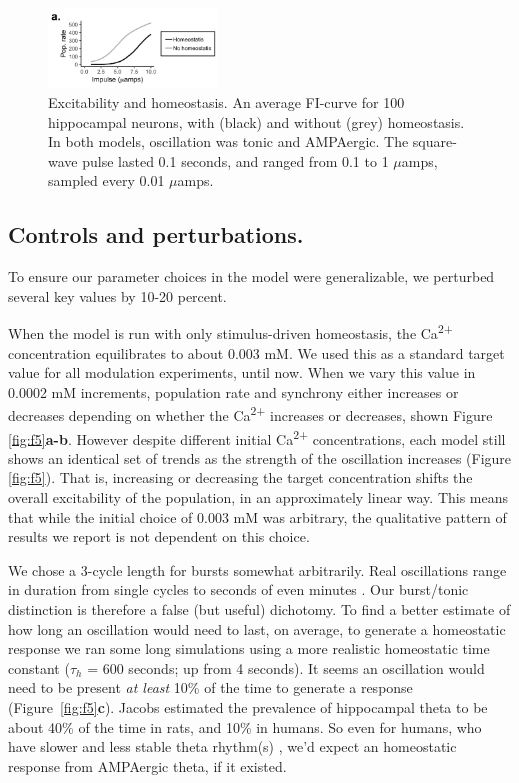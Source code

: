 \documentclass{article}
\begin{document}
\begin{figure}
\centering
\includegraphics[width=0.4\textwidth]{fig4.png}
\caption{\label{fig:f4}
Excitability and homeostasis. An average FI-curve for 100 hippocampal neurons, with (black) and without (grey) homeostasis. In both models, oscillation was tonic and AMPAergic. The square-wave pulse lasted 0.1 seconds, and ranged from 0.1 to 1 $\mu$amps, sampled every 0.01 $\mu$amps.
}
\end{figure}

\subsection*{Controls and perturbations.}
To ensure our parameter choices in the model were generalizable, we perturbed several key values by 10-20 percent.

When the model is run with only stimulus-driven homeostasis, the Ca\textsuperscript{2+} concentration equilibrates to about 0.003 mM. We used this as a standard target value for all modulation experiments, until now. When we vary this value in 0.0002 mM increments, population rate and synchrony either increases or decreases depending on whether the Ca\textsuperscript{2+} increases or decreases, shown Figure \ref{fig:f5}\textbf{a-b}. However despite different initial Ca\textsuperscript{2+} concentrations, each model still shows an identical set of trends as the strength of the oscillation increases (Figure \ref{fig:f5}). That is, increasing or decreasing the target concentration shifts the overall excitability of the population, in an approximately linear way. This means that while the initial choice of 0.003 mM was arbitrary, the qualitative pattern of results we report is not dependent on this choice.

We chose a 3-cycle length for bursts somewhat arbitrarily. Real oscillations range in duration from single cycles to seconds of even minutes \cite{Lundqvist2016,vanEde2018}. Our burst/tonic distinction is therefore a false (but useful) dichotomy. To find a better estimate of how long an oscillation would need to last, on average, to generate a homeostatic response we ran some long simulations using a more realistic homeostatic time constant ($\tau_h$ = 600 seconds; up from 4 seconds). It seems an oscillation would need to be present \textit{at least} 10\% of the time to generate a response (Figure~\ref{fig:f5}\textbf{c}). Jacobs \cite{Jacobs2014} estimated the prevalence of hippocampal theta to be about 40\% of the time in rats, and 10\% in humans. So even for humans, who have slower and less stable theta rhythm(s) \cite{Goyal2018}, we'd expect an homeostatic response from AMPAergic theta, if it existed.
\end{document}
